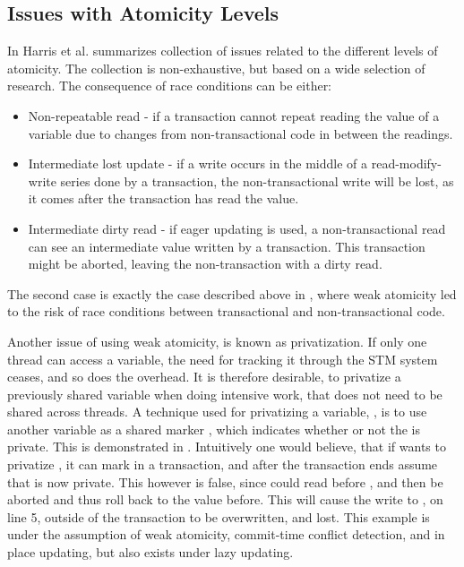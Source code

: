 \subsection{Issues with Atomicity Levels}
In \cite[p. 30-35]{harris2010transactional} Harris et al. summarizes collection of issues related to the different levels of atomicity. The collection is non-exhaustive, but based on a wide selection of research. The consequence of race conditions can be either:
\begin{itemize}
	\item Non-repeatable read - if a transaction cannot repeat reading the value of a variable due to changes from non-transactional code in between the readings.
	\item Intermediate lost update - if a write occurs in the middle of a read-modify-write series done by a transaction, the non-transactional write will be lost, as it comes after the transaction has read the value.
	\item Intermediate dirty read - if eager updating\cite[p. 53]{dpt907e14trending} is used, a non-transactional read can see an intermediate value written by a transaction. This transaction might be aborted, leaving the non-transaction with a dirty read.
\end{itemize}
The second case is exactly the case described above in , where weak atomicity led to the risk of race conditions between transactional and non-transactional code. 

Another issue of using weak atomicity, is known as privatization. If only one thread can access a variable, the need for tracking it through the \ac{STM} system ceases, and so does the overhead. It is therefore desirable, to privatize a previously shared variable when doing intensive work, that does not need to be shared across threads. A technique used for privatizing a variable, , is to use another variable as a shared marker , which indicates whether or not the  is private. This is demonstrated in . Intuitively one would believe, that if  wants to privatize , it can mark  in a transaction, and after the transaction ends assume that  is now private. This however is false, since  could read  before , and then be aborted and thus roll  back to the value before. This will cause the write to , on line 5, outside of the transaction to be overwritten, and lost. This example is under the assumption of weak atomicity, commit-time conflict detection, and in place updating, but also exists under lazy updating\cite[p. 34]{harris2010transactional}. 

